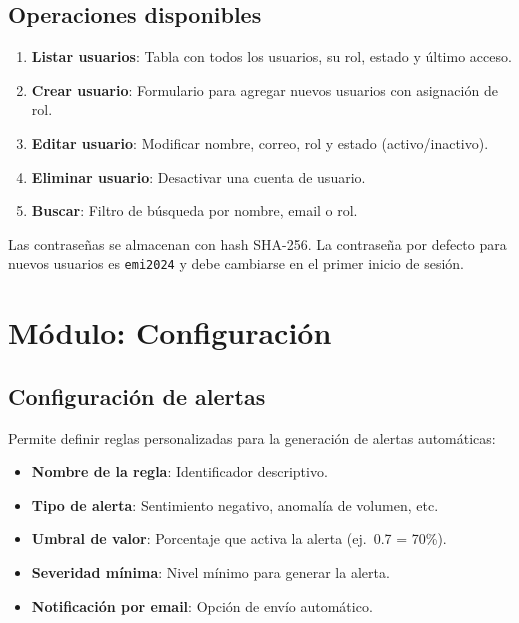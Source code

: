 \documentclass[12pt,a4paper]{article}
\begin{document}
\subsection{Operaciones disponibles}
\begin{enumerate}
  \item \textbf{Listar usuarios}: Tabla con todos los usuarios, su rol, estado y último acceso.
  \item \textbf{Crear usuario}: Formulario para agregar nuevos usuarios con asignación de rol.
  \item \textbf{Editar usuario}: Modificar nombre, correo, rol y estado (activo/inactivo).
  \item \textbf{Eliminar usuario}: Desactivar una cuenta de usuario.
  \item \textbf{Buscar}: Filtro de búsqueda por nombre, email o rol.
\end{enumerate}

\begin{infobox}
Las contraseñas se almacenan con hash SHA-256. La contraseña por defecto para nuevos usuarios es \texttt{emi2024} y debe cambiarse en el primer inicio de sesión.
\end{infobox}

\section{Módulo: Configuración}

\subsection{Configuración de alertas}
Permite definir reglas personalizadas para la generación de alertas automáticas:
\begin{itemize}
  \item \textbf{Nombre de la regla}: Identificador descriptivo.
  \item \textbf{Tipo de alerta}: Sentimiento negativo, anomalía de volumen, etc.
  \item \textbf{Umbral de valor}: Porcentaje que activa la alerta (ej.\ 0.7 = 70\%).
  \item \textbf{Severidad mínima}: Nivel mínimo para generar la alerta.
  \item \textbf{Notificación por email}: Opción de envío automático.
\end{itemize}
\end{document}
